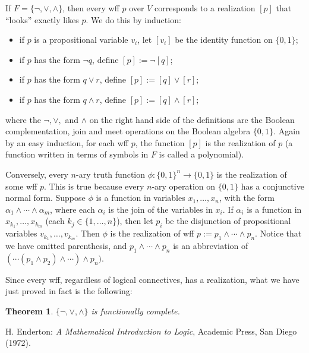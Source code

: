 \documentclass[12pt]{article}
\newtheorem{thm}{Theorem}
\begin{document}
If $F=\lbrace \neg, \vee, \wedge \rbrace$, then every wff $p$ over $V$ corresponds to a realization $[p]$ that ``looks'' exactly likes $p$.  We do this by induction:
\begin{itemize}
\item if $p$ is a propositional variable $v_i$, let $[v_i]$ be the identity function on $\lbrace 0,1\rbrace$;
\item if $p$ has the form $\neg q$, define $[p]:=\neg [q]$;
\item if $p$ has the form $q\vee r$, define $[p]:=[q]\vee [r]$;
\item if $p$ has the form $q\wedge r$, define $[p]:=[q]\wedge [r]$;
\end{itemize}
where the $\neg, \vee,$ and $\wedge$ on the right hand side of the definitions are the Boolean complementation, join and meet operations on the Boolean algebra $\lbrace 0,1\rbrace$.  Again by an easy induction, for each wff $p$, the function $[p]$ is the realization of $p$ (a function written in terms of symbols in $F$ is called a polynomial).

Conversely, every $n$-ary truth function $\phi: \lbrace 0,1\rbrace^n \to \lbrace 0,1\rbrace$ is the realization of some wff $p$.  This is true because every $n$-ary operation on $\lbrace 0,1\rbrace$ has a conjunctive normal form.  Suppose $\phi$ is a function in variables $x_1, \ldots, x_n$, with the form $\alpha_1 \wedge \cdots \wedge \alpha_m$, where each $\alpha_i$ is the join of the variables in $x_i$.  If $\alpha_i$ is a function in $x_{k_1},\ldots, x_{k_m}$ (each $k_j \in \lbrace 1,\ldots, n\rbrace$), then let $p_i$ be the disjunction of propositional variables $v_{k_1}, \ldots, v_{k_m}$.  Then $\phi$ is the realization of wff $p:= p_1\wedge \cdots \wedge p_n$.  Notice that we have omitted parenthesis, and $p_1\wedge \cdots \wedge p_n$ is an abbreviation of $(\cdots (p_1 \wedge p_2) \wedge \cdots ) \wedge p_n)$.

Since every wff, regardless of logical connectives, has a realization, what we have just proved in fact is the following: 
\begin{thm}
$\lbrace \neg, \vee, \wedge \rbrace$ is functionally complete.
\end{thm}

\begin{thebibliography}{7}
 H. Enderton: {\em A Mathematical Introduction to Logic}, Academic Press, San Diego (1972).
\end{thebibliography}
\end{document}
